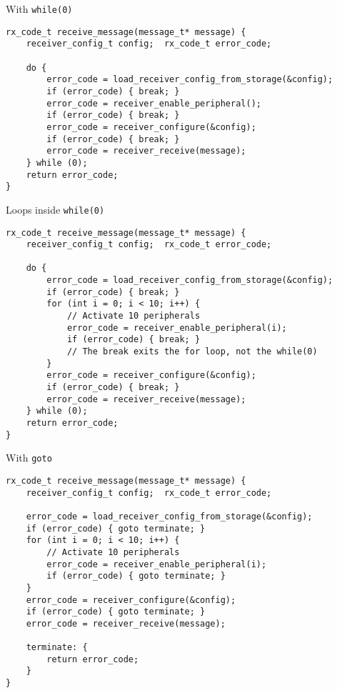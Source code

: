 \documentclass[aspectratio=169,14pt]{beamer}
\begin{document}
\begin{frame}[fragile]{With \texttt{while(0)}}
\begin{lstlisting}[style=cstyle]
rx_code_t receive_message(message_t* message) {
    receiver_config_t config;  rx_code_t error_code;
    
    do {
        error_code = load_receiver_config_from_storage(&config);
        if (error_code) { break; }
        error_code = receiver_enable_peripheral();
        if (error_code) { break; }
        error_code = receiver_configure(&config);
        if (error_code) { break; }
        error_code = receiver_receive(message);
    } while (0);
    return error_code;
}
\end{lstlisting}
\end{frame}



\begin{frame}[fragile]{Loops inside \texttt{while(0)}}
\begin{lstlisting}[style=cstyle]
rx_code_t receive_message(message_t* message) {
    receiver_config_t config;  rx_code_t error_code;
    
    do {
        error_code = load_receiver_config_from_storage(&config);
        if (error_code) { break; }
        for (int i = 0; i < 10; i++) {
            // Activate 10 peripherals
            error_code = receiver_enable_peripheral(i);
            if (error_code) { break; }
            // The break exits the for loop, not the while(0)
        }
        error_code = receiver_configure(&config);
        if (error_code) { break; }
        error_code = receiver_receive(message);
    } while (0);
    return error_code;
}
\end{lstlisting}
\end{frame}



\begin{frame}[fragile]{With \texttt{goto}}
\begin{lstlisting}[style=cstyle]
rx_code_t receive_message(message_t* message) {
    receiver_config_t config;  rx_code_t error_code;
    
    error_code = load_receiver_config_from_storage(&config);
    if (error_code) { goto terminate; }
    for (int i = 0; i < 10; i++) {
        // Activate 10 peripherals
        error_code = receiver_enable_peripheral(i);
        if (error_code) { goto terminate; }
    }
    error_code = receiver_configure(&config);
    if (error_code) { goto terminate; }
    error_code = receiver_receive(message);
    
    terminate: {
        return error_code;
    }
}
\end{lstlisting}
\end{frame}
\end{document}
